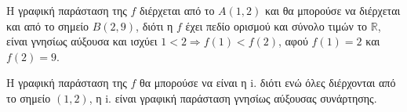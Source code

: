 \begin{alist}
\item Η γραφική παράσταση της $f$ διέρχεται από το $A(1,2)$ και θα μπορούσε να διέρχεται και από το σημείο $B(2,9)$, διότι η $f$ έχει πεδίο ορισμού και σύνολο τιμών το $\mathbb{R}$, είναι γνησίως αύξουσα και ισχύει $1 < 2 \Rightarrow f(1) < f(2)$, αφού $f(1)=2$ και $f(2)=9$.
\item Η γραφική παράσταση της $f$ θα μπορούσε να είναι η i. διότι ενώ όλες διέρχονται από το σημείο $(1,2)$, η i. είναι γραφική παράσταση γνησίως αύξουσας συνάρτησης.
\end{alist}

